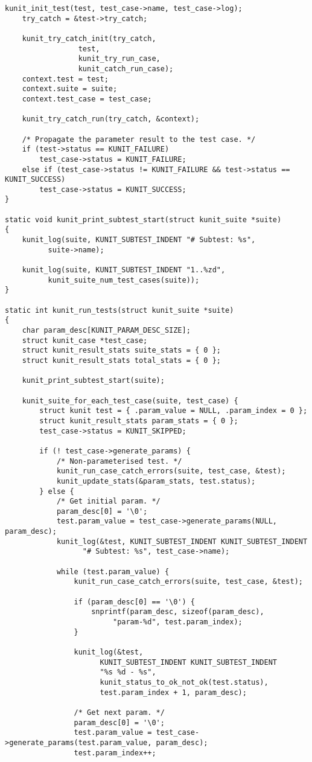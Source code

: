 \documentclass{article}
\begin{document}
\begin{lstlisting}[style=CStyle]
	kunit_init_test(test, test_case->name, test_case->log);
	try_catch = &test->try_catch;

	kunit_try_catch_init(try_catch,
			     test,
			     kunit_try_run_case,
			     kunit_catch_run_case);
	context.test = test;
	context.suite = suite;
	context.test_case = test_case;
	
	kunit_try_catch_run(try_catch, &context);

	/* Propagate the parameter result to the test case. */
	if (test->status == KUNIT_FAILURE)
		test_case->status = KUNIT_FAILURE;
	else if (test_case->status != KUNIT_FAILURE && test->status == KUNIT_SUCCESS)
		test_case->status = KUNIT_SUCCESS;
}

static void kunit_print_subtest_start(struct kunit_suite *suite)
{
	kunit_log(suite, KUNIT_SUBTEST_INDENT "# Subtest: %s",
		  suite->name);
	
	kunit_log(suite, KUNIT_SUBTEST_INDENT "1..%zd",
		  kunit_suite_num_test_cases(suite));
}

static int kunit_run_tests(struct kunit_suite *suite)
{
	char param_desc[KUNIT_PARAM_DESC_SIZE];
	struct kunit_case *test_case;
	struct kunit_result_stats suite_stats = { 0 };
	struct kunit_result_stats total_stats = { 0 };

	kunit_print_subtest_start(suite);

	kunit_suite_for_each_test_case(suite, test_case) {
		struct kunit test = { .param_value = NULL, .param_index = 0 };
		struct kunit_result_stats param_stats = { 0 };
		test_case->status = KUNIT_SKIPPED;

		if (! test_case->generate_params) {
			/* Non-parameterised test. */
			kunit_run_case_catch_errors(suite, test_case, &test);
			kunit_update_stats(&param_stats, test.status);
		} else {
			/* Get initial param. */
			param_desc[0] = '\0';
			test.param_value = test_case->generate_params(NULL, param_desc);
			kunit_log(&test, KUNIT_SUBTEST_INDENT KUNIT_SUBTEST_INDENT
				  "# Subtest: %s", test_case->name);

			while (test.param_value) {
				kunit_run_case_catch_errors(suite, test_case, &test);

				if (param_desc[0] == '\0') {
					snprintf(param_desc, sizeof(param_desc),
						 "param-%d", test.param_index);
				}

				kunit_log(&test,
					  KUNIT_SUBTEST_INDENT KUNIT_SUBTEST_INDENT
					  "%s %d - %s",
					  kunit_status_to_ok_not_ok(test.status),
					  test.param_index + 1, param_desc);

				/* Get next param. */
				param_desc[0] = '\0';
				test.param_value = test_case->generate_params(test.param_value, param_desc);
				test.param_index++;


\end{lstlisting}
\end{document}
